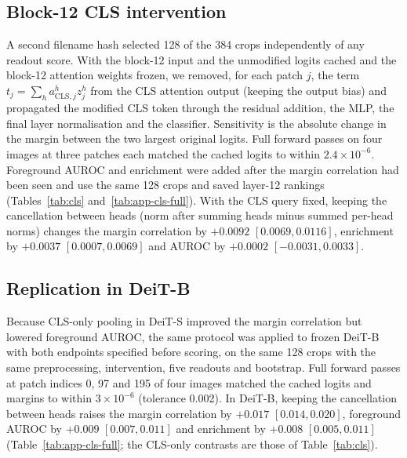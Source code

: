 \subsection{Block-12 CLS intervention}
A second filename hash selected 128 of the 384 crops independently of any readout score. With the block-12 input and the unmodified logits cached and the block-12 attention weights frozen, we removed, for each patch $j$, the term $t_j=\sum_h a^h_{\mathrm{CLS},j}z_j^h$ from the CLS attention output (keeping the output bias) and propagated the modified CLS token through the residual addition, the MLP, the final layer normalisation and the classifier. Sensitivity is the absolute change in the margin between the two largest original logits. Full forward passes on four images at three patches each matched the cached logits to within $2.4\times10^{-6}$. Foreground AUROC and enrichment were added after the margin correlation had been seen and use the same 128 crops and saved layer-12 rankings (Tables~\ref{tab:cls} and~\ref{tab:app-cls-full}). With the CLS query fixed, keeping the cancellation between heads (norm after summing heads minus summed per-head norms) changes the margin correlation by $+0.0092$ $[0.0069, 0.0116]$, enrichment by $+0.0037$ $[0.0007, 0.0069]$ and AUROC by $+0.0002$ $[-0.0031, 0.0033]$.

\subsection{Replication in DeiT-B}
\label{app:replication}
Because CLS-only pooling in DeiT-S improved the margin correlation but lowered foreground AUROC, the same protocol was applied to frozen DeiT-B with both endpoints specified before scoring, on the same 128 crops with the same preprocessing, intervention, five readouts and bootstrap. Full forward passes at patch indices 0, 97 and 195 of four images matched the cached logits and margins to within $3\times10^{-6}$ (tolerance 0.002). In DeiT-B, keeping the cancellation between heads raises the margin correlation by $+0.017$ $[0.014, 0.020]$, foreground AUROC by $+0.009$ $[0.007, 0.011]$ and enrichment by $+0.008$ $[0.005, 0.011]$ (Table~\ref{tab:app-cls-full}; the CLS-only contrasts are those of Table~\ref{tab:cls}).

\begin{table}[!htbp]
\caption{All five layer-12 readouts on the same 128 Oxford-IIIT Pet crops. Intervention $\rho$ is the Spearman correlation with the margin changes caused by the block-12 CLS intervention; foreground AUROC and enrichment compare the maps with the foreground masks.}
\label{tab:app-cls-full}
\centering\small\setlength{\tabcolsep}{4pt}
\end{table}

